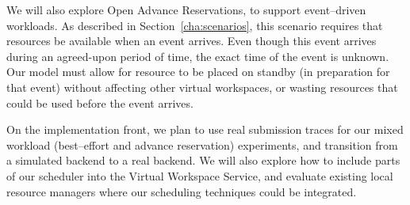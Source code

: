 We will also explore Open Advance Reservations, to support event--driven workloads. As described in Section~\ref{cha:scenarios}, this scenario requires that resources be available when an event arrives. Even though this event arrives during an agreed-upon period of time, the exact time of the event is unknown. Our model must allow for resource to be placed on standby (in preparation for that event) without affecting other virtual workspaces, or wasting resources that could be used before the event arrives.

On the implementation front, we plan to use real submission traces for our mixed workload (best--effort and advance reservation) experiments, and transition from a simulated backend to a real backend. We will also explore how to include parts of our scheduler into the Virtual Workspace Service, and evaluate existing local resource managers where our scheduling techniques could be integrated.
